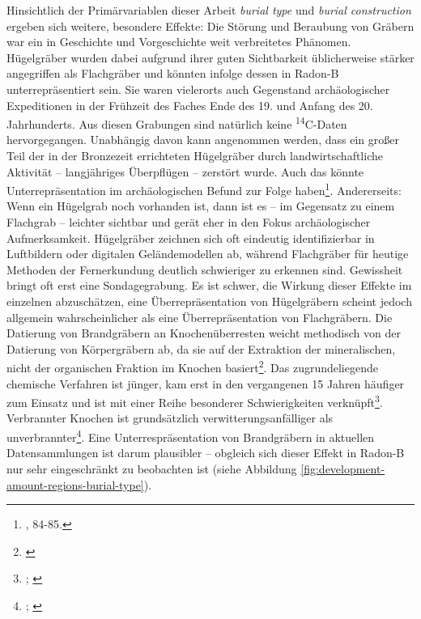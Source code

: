 \documentclass[openany,twoside,twocolumn]{book}
\let\rmarkdownfootnote\footnote%
\def\footnote{\protect\rmarkdownfootnote}
\begin{document}
Hinsichtlich der Primärvariablen dieser Arbeit \emph{burial type} und
\emph{burial construction} ergeben sich weitere, besondere Effekte: Die
Störung und Beraubung von Gräbern war ein in Geschichte und
Vorgeschichte weit verbreitetes Phänomen. Hügelgräber wurden dabei
aufgrund ihrer guten Sichtbarkeit üblicherweise stärker angegriffen als
Flachgräber und könnten infolge dessen in Radon-B unterrepräsentiert
sein. Sie waren vielerorts auch Gegenstand archäologischer Expeditionen
in der Frühzeit des Faches Ende des 19. und Anfang des 20. Jahrhunderts.
Aus diesen Grabungen sind natürlich keine \textsuperscript{14}C-Daten
hervorgegangen. Unabhängig davon kann angenommen werden, dass ein großer
Teil der in der Bronzezeit errichteten Hügelgräber durch
landwirtschaftliche Aktivität -- langjähriges Überpflügen -- zerstört
wurde. Auch das könnte Unterrepräsentation im archäologischen Befund zur
Folge haben\footnote{\textcite{harding_european_2000}, 84-85.}.
Andererseits: Wenn ein Hügelgrab noch vorhanden ist, dann ist es -- im
Gegensatz zu einem Flachgrab -- leichter sichtbar und gerät eher in den
Fokus archäologischer Aufmerksamkeit. Hügelgräber zeichnen sich oft
eindeutig identifizierbar in Luftbildern oder digitalen Geländemodellen
ab, während Flachgräber für heutige Methoden der Fernerkundung deutlich
schwieriger zu erkennen sind. Gewissheit bringt oft erst eine
Sondagegrabung. Es ist schwer, die Wirkung dieser Effekte im einzelnen
abzuschätzen, eine Überrepräsentation von Hügelgräbern scheint jedoch
allgemein wahrscheinlicher als eine Überrepräsentation von Flachgräbern.
Die Datierung von Brandgräbern an Knochenüberresten weicht methodisch
von der Datierung von Körpergräbern ab, da sie auf der Extraktion der
mineralischen, nicht der organischen Fraktion im Knochen
basiert\footnote{\textcite{lanting_dating_2001}}. Das zugrundeliegende
chemische Verfahren ist jünger, kam erst in den vergangenen 15 Jahren
häufiger zum Einsatz und ist mit einer Reihe besonderer Schwierigkeiten
verknüpft\footnote{\textcite{olsen_characterisation_2008};
  \textcite{strydonck_14c_2009}}. Verbrannter Knochen ist grundsätzlich
verwitterungsanfälliger als unverbrannter\footnote{\textcite{kalsbeek_preservation_2006};
  \textcite{stiner_differential_1995}}. Eine Unterrespräsentation von
Brandgräbern in aktuellen Datensammlungen ist darum plausibler --
obgleich sich dieser Effekt in Radon-B nur sehr eingeschränkt zu
beobachten ist (siehe Abbildung
\ref{fig:development-amount-regions-burial-type}).
\end{document}
